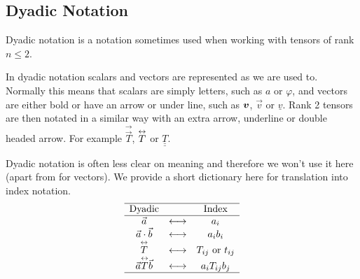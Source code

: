 \documentclass[a4paper]{article}
\begin{document}
    \subsection{Dyadic Notation}
    Dyadic notation is a notation sometimes used when working with tensors of rank \(n \le 2\).
    \begin{notation*}{}
    In dyadic notation scalars and vectors are represented as we are used to.
    Normally this means that scalars are simply letters, such as \(a\) or \(\varphi\), and vectors are either bold or have an arrow or under line, such as \(\bm{v}\), \(\vec{v}\) or \(\underline{v}\).
    Rank 2 tensors are then notated in a similar way with an extra arrow, underline or double headed arrow.
    For example \(\vec{\vec{T}}\), \(\overset{\tiny\leftrightarrow}{T}\) or \(\underline{\underline{T}}\).
    \end{notation*}
    Dyadic notation is often less clear on meaning and therefore we won't use it here (apart from for vectors).
    We provide a short dictionary here for translation into index notation.
    \[
        \begin{array}{ccc}\hline
            \text{Dyadic} &  & \text{Index}\\\hline
            \vec{a} & \longleftrightarrow & a_i\\
            \vec{a} \cdot \vec{b} & \longleftrightarrow & a_ib_i\\
            \overset{\tiny\leftrightarrow}{T} & \longleftrightarrow & T_{ij}~\text{or}~t_{ij}\\
            \vec{a}\overset{\tiny\leftrightarrow}{T}\vec{b} & \longleftrightarrow & a_iT_{ij}b_j\\\hline
        \end{array}
    \]
    
\end{document}
